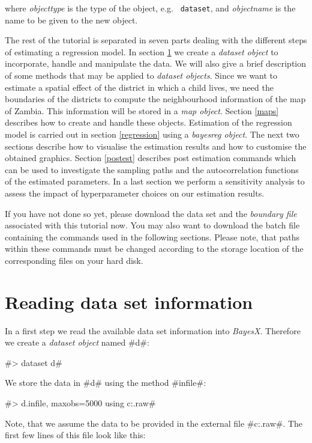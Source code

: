 \documentclass{article}
\begin{document}
where {\em objecttype} is the type of the object, e.g. {\tt
dataset}, and {\em objectname} is the name to be given to the new
object.

The rest of the tutorial is separated in seven parts dealing with
the different steps of estimating a regression model. In section
\ref{datasets} we create a {\em dataset object} to incorporate,
handle and manipulate the data. We will also give a brief
description of some methods that may be applied to {\em dataset
objects}. Since we want to estimate a spatial effect of the
district in which a child lives, we need the boundaries of the
districts to compute the neighbourhood information of the map of
Zambia. This information will be stored in a {\em map object}.
Section \ref{maps} describes how to create and handle these
objects. Estimation of the regression model is carried out in
section \ref{regression} using a {\em bayesreg object}. The next
two sections describe how to visualise the estimation results and
how to customise the obtained graphics. Section \ref{postest}
describes post estimation commands which can be used to
investigate the sampling paths and the autocorrelation functions
of the estimated parameters. In a last section we perform a
sensitivity analysis to assess the impact of hyperparameter
choices on our estimation results.

If you have not done so yet, please download the data set and the
{\it boundary file} associated with this tutorial now. You may
also want to download the batch file containing the commands used
in the following sections. Please note, that paths within these
commands must be changed according to the storage location of the
corresponding files on your hard disk.

\section{Reading data set information}\label{datasets}

In a first step we read the available data set information into
{\it BayesX}. Therefore we create a {\it dataset object} named
#d#:

#> dataset d#

We store the data in #d# using the method #infile#:

#> d.infile, maxobs=5000 using c:\data\zambia.raw#

Note, that we assume the data to be provided in the external file
#c:\data\zambia.raw#. The first few lines of this file look like
this:
\end{document}
